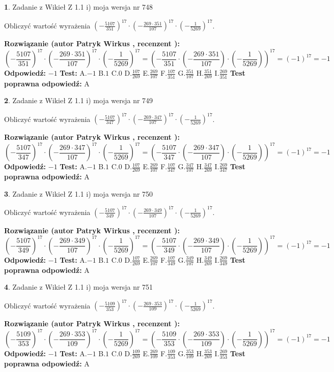 \documentclass[12pt, a4paper]{article}
\theoremstyle{definition} %
\newtheorem{zad}{}
\newcommand{\zadStart}[1]{\begin{zad}#1\newline}
\newcommand{\zadStop}{\end{zad}}
\newcommand{\rozwStart}[2]{\noindent \textbf{Rozwiązanie (autor #1 , recenzent #2): }\newline}
\newcommand{\rozwStop}{\newline}
\newcommand{\odpStart}{\noindent \textbf{Odpowiedź:}\newline}
\newcommand{\odpStop}{\newline}
\newcommand{\testStart}{\noindent \textbf{Test:}\newline}
\newcommand{\testStop}{\newline}
\newcommand{\kluczStart}{\noindent \textbf{Test poprawna odpowiedź:}\newline}
\newcommand{\kluczStop}{\newline}
\begin{document}
\zadStart{Zadanie z Wikieł Z 1.1 i) moja wersja nr 748}

Obliczyć wartość wyrażenia $(-\frac{5107}{351})^{17} \cdot (-\frac{269 \cdot 351}{107})^{17} \cdot (-\frac{1}{5269})^{17}$.
\zadStop
\rozwStart{Patryk Wirkus}{}
$$(-\frac{5107}{351})^{17} \cdot (-\frac{269 \cdot 351}{107})^{17} \cdot (-\frac{1}{5269})^{17} = (-\frac{5107}{351} \cdot (-\frac{269 \cdot 351}{107}) \cdot (-\frac{1}{5269}))^{17} = (-1)^{17} = -1$$
\rozwStop
\odpStart
$-1$
\odpStop
\testStart
A.$-1$ B.$1$ C.$0$ D.$\frac{107}{269}$ E.$\frac{269}{107}$
F.$\frac{107}{351}$ G.$\frac{351}{107}$
H.$\frac{351}{269}$
I.$\frac{269}{351}$
\testStop
\kluczStart
A
\kluczStop



\zadStart{Zadanie z Wikieł Z 1.1 i) moja wersja nr 749}

Obliczyć wartość wyrażenia $(-\frac{5107}{347})^{17} \cdot (-\frac{269 \cdot 347}{107})^{17} \cdot (-\frac{1}{5269})^{17}$.
\zadStop
\rozwStart{Patryk Wirkus}{}
$$(-\frac{5107}{347})^{17} \cdot (-\frac{269 \cdot 347}{107})^{17} \cdot (-\frac{1}{5269})^{17} = (-\frac{5107}{347} \cdot (-\frac{269 \cdot 347}{107}) \cdot (-\frac{1}{5269}))^{17} = (-1)^{17} = -1$$
\rozwStop
\odpStart
$-1$
\odpStop
\testStart
A.$-1$ B.$1$ C.$0$ D.$\frac{107}{269}$ E.$\frac{269}{107}$
F.$\frac{107}{347}$ G.$\frac{347}{107}$
H.$\frac{347}{269}$
I.$\frac{269}{347}$
\testStop
\kluczStart
A
\kluczStop



\zadStart{Zadanie z Wikieł Z 1.1 i) moja wersja nr 750}

Obliczyć wartość wyrażenia $(-\frac{5107}{349})^{17} \cdot (-\frac{269 \cdot 349}{107})^{17} \cdot (-\frac{1}{5269})^{17}$.
\zadStop
\rozwStart{Patryk Wirkus}{}
$$(-\frac{5107}{349})^{17} \cdot (-\frac{269 \cdot 349}{107})^{17} \cdot (-\frac{1}{5269})^{17} = (-\frac{5107}{349} \cdot (-\frac{269 \cdot 349}{107}) \cdot (-\frac{1}{5269}))^{17} = (-1)^{17} = -1$$
\rozwStop
\odpStart
$-1$
\odpStop
\testStart
A.$-1$ B.$1$ C.$0$ D.$\frac{107}{269}$ E.$\frac{269}{107}$
F.$\frac{107}{349}$ G.$\frac{349}{107}$
H.$\frac{349}{269}$
I.$\frac{269}{349}$
\testStop
\kluczStart
A
\kluczStop



\zadStart{Zadanie z Wikieł Z 1.1 i) moja wersja nr 751}

Obliczyć wartość wyrażenia $(-\frac{5109}{353})^{17} \cdot (-\frac{269 \cdot 353}{109})^{17} \cdot (-\frac{1}{5269})^{17}$.
\zadStop
\rozwStart{Patryk Wirkus}{}
$$(-\frac{5109}{353})^{17} \cdot (-\frac{269 \cdot 353}{109})^{17} \cdot (-\frac{1}{5269})^{17} = (-\frac{5109}{353} \cdot (-\frac{269 \cdot 353}{109}) \cdot (-\frac{1}{5269}))^{17} = (-1)^{17} = -1$$
\rozwStop
\odpStart
$-1$
\odpStop
\testStart
A.$-1$ B.$1$ C.$0$ D.$\frac{109}{269}$ E.$\frac{269}{109}$
F.$\frac{109}{353}$ G.$\frac{353}{109}$
H.$\frac{353}{269}$
I.$\frac{269}{353}$
\testStop
\kluczStart
A
\kluczStop
\end{document}
